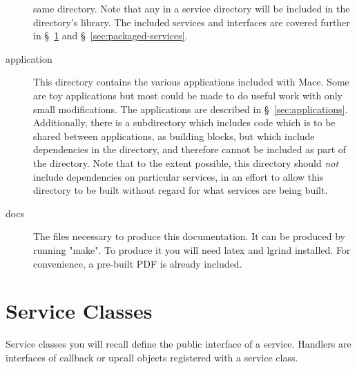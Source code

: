 \begin{description}
            same directory.  Note that any  in a service directory will be included
            in the directory's library.  The included services and interfaces are covered further in 
            \S~\ref{sec:service-classes} and \S~\ref{sec:packaged-services}.
\item[application] This directory contains the various applications included with Mace.  Some are toy applications
            but most could be made to do useful work with only small modifications.  The applications are
            described in \S~\ref{sec:applications}.  Additionally, there is a  subdirectory
            which includes code which is to be shared between applications, as building blocks, but which include
            dependencies in the  directory, and therefore cannot be included
            as part of the  directory.  Note that to the extent possible, this directory should
            \emph{not} include dependencies on particular services, in an effort to allow this directory to be built 
            without regard for what services are being built.
\item [docs] The files necessary to produce this documentation.  It can be produced by running "make".  To 
            produce it you will need latex and lgrind installed.  For convenience, a pre-built PDF is already
            included.
\end{description}

\section{Service Classes}
\label{sec:service-classes}


Service classes you will recall define the public interface of a service.
Handlers are interfaces of callback or upcall objects registered with 
a service class.

